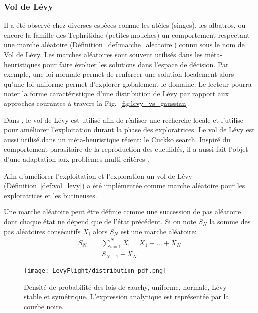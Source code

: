 \subsubsection{Vol de Lévy} %
\label{ssub:vol_de_levy}
Il a été observé chez diverses espèces comme les atèles (singes), les albatros, ou encore la famille des
Tephritidae (petites mouches) un comportement respectant une marche aléatoire (Définition~\ref{def:marche_aleatoire}) connu
sous le nom de Vol de Lévy.
Les marches aléatoires sont souvent utilisés dans les méta-heuristiques pour faire
évoluer les solutions dans l’espace de décision. Par exemple, une loi normale permet
de renforcer une solution localement alors qu’une loi uniforme permet d’explorer
globalement le domaine. Le lecteur pourra noter la forme caractéristique d’une distribution
de Lévy par rapport aux approches courantes à travers la Fig.~\ref{fig:levy_vs_gaussian}.

Dans \cite{Sharma2012213}, le vol de Lévy est utilisé afin de réaliser une recherche locale
et \cite{Hakli2013254} l’utilise pour améliorer l’exploitation durant la phase des exploratrices.
Le vol de Lévy est aussi utilisé dans un méta-heuristique récent: le Cuckko search.
Inspiré du comportement parasitaire de la reproduction des cuculidés, il a aussi fait l’objet
d’une adaptation aux problèmes multi-critères \parencite{Yang20131616}.

Afin d’améliorer l’exploitation et l’exploration un vol de Lévy (Définition~\ref{def:vol_levy})
a été implémentée comme marche aléatoire pour les exploratrices et les butineuses.

\begin{Def}\label{def:marche_aleatoire}
Une marche aléatoire \parencite{Yang201445} peut être définie comme une succession de pas
aléatoire dont chaque état ne dépend que de l’état précédent. Si on note $S_{N}$
la somme des pas aléatoires consécutifs $X_{i}$ alors $S_{N}$ est une marche aléatoire:
\begin{equation}\label{eq:marche_aleatoire}
    \begin{split}
        S_{N} &= \sum_{i=1}^{N} X_{i} = X_{1} + ... + X_{N}\\
              &= S_{N-1} + X_{N}
    \end{split}
\end{equation}
\end{Def}

\begin{figure}
    \begin{center}
        \texttt{[image: LevyFlight/distribution\_pdf.png]}
    \end{center}
    \caption{Densité de probabilité des lois de cauchy, uniforme, normale, Lévy stable et symétrique.
             L’expression analytique est représentée par la courbe noire.
             \label{fig:distribution_pdf}}
\end{figure}


